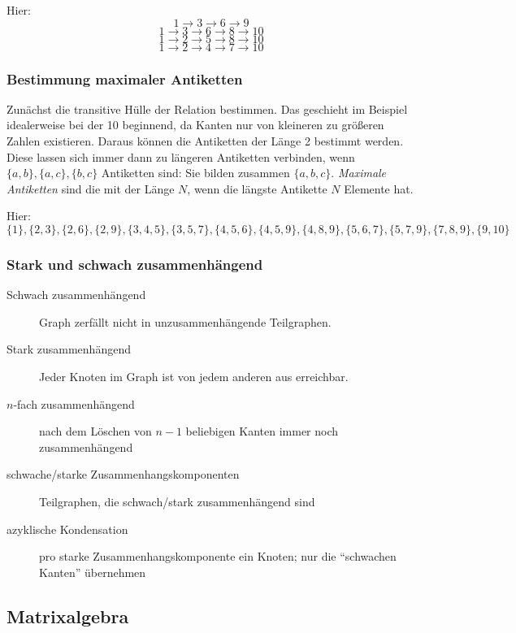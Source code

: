 Hier:
\[1 \rightarrow 3 \rightarrow 6 \rightarrow 9\]
\[1 \rightarrow 3 \rightarrow 6 \rightarrow 8 \rightarrow 10\]
\[1 \rightarrow 2 \rightarrow 5 \rightarrow 8 \rightarrow 10\]
\[1 \rightarrow 2 \rightarrow 4 \rightarrow 7 \rightarrow 10\]


\subsubsection{Bestimmung maximaler Antiketten}
Zunächst die transitive Hülle der Relation bestimmen. Das geschieht im Beispiel idealerweise
bei der 10 beginnend, da Kanten nur von kleineren zu größeren Zahlen existieren. Daraus können
die Antiketten der Länge 2 bestimmt werden. Diese lassen sich immer dann zu längeren Antiketten
verbinden, wenn $\{a,b\}, \{a,c\}, \{b, c\}$ Antiketten sind: Sie bilden zusammen $\{a,b,c\}$.
\textit{Maximale Antiketten} sind die mit der Länge $N$, wenn die längste Antikette $N$
Elemente hat.

Hier:
\[\{1\}, \{2,3\}, \{2,6\}, \{2,9\}, \{3, 4,5\}, \{3, 5, 7\}, \{4, 5, 6\}, \{4,5,9\}, \{4,8,9\},
\{5,6,7\},\{5,7,9\}, \{7,8,9\}, \{9,10\}\]


\subsubsection{Stark und schwach zusammenhängend}
\begin{description}
    \item[Schwach zusammenhängend] Graph zerfällt nicht in unzusammenhängende Teilgraphen.
    \item[Stark zusammenhängend] Jeder Knoten im Graph ist von jedem anderen aus erreichbar.
    \item[$n$-fach zusammenhängend] nach dem Löschen von $n−1$ beliebigen Kanten immer noch zusammenhängend
    \item[schwache/starke Zusammenhangskomponenten] Teilgraphen, die schwach/stark zusammenhängend sind
    \item[azyklische Kondensation] pro starke Zusammenhangskomponente ein Knoten; nur die ``schwachen Kanten'' übernehmen
\end{description}

\subsection{Matrixalgebra}

